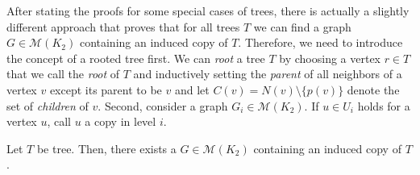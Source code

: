 After stating the proofs for some special cases of trees, there is actually a slightly different approach that proves that for all trees $T$ we can find a graph $G\in\mathcal{M}(K_2)$ containing an induced copy of $T$. Therefore, we need to introduce the concept of a rooted tree first. We can \textit{root} a tree $T$ by choosing a vertex $r\in T$ that we call the \textit{root} of $T$ and inductively setting the \textit{parent} of all neighbors of a vertex $v$ except its parent to be $v$ and let $C(v) =N(v)\setminus \lbrace p(v)\rbrace$ denote the set of \textit{children} of $v$.
Second, consider a graph $G_i\in\mathcal{M}(K_2)$. If $u\in U_i$ holds for a vertex $u$, call $u$ a copy in level $i$.
\begin{thm}
Let $T$ be tree. Then, there exists a $G\in\mathcal{M}(K_2)$ containing an induced copy of $T$.
\end{thm}
